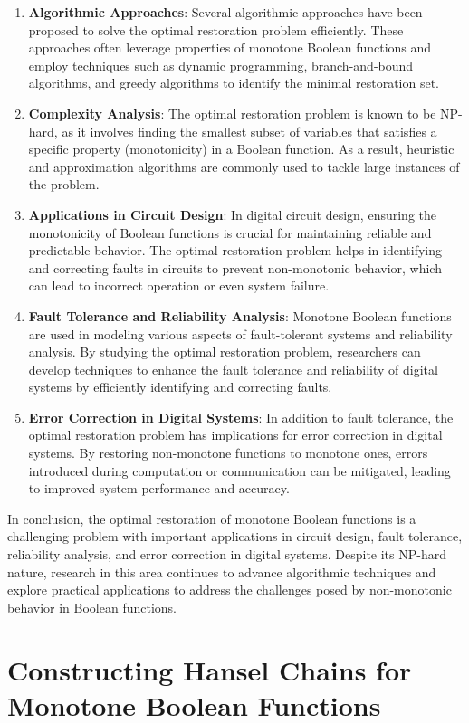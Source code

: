 \documentclass{article}
\renewcommand{\_}{\ifincsname_\else\legacyunderscore\fi}
\begin{document}
\begin{enumerate}
    \item \textbf{Algorithmic Approaches}: Several algorithmic approaches have been proposed to solve the optimal restoration problem efficiently. These approaches often leverage properties of monotone Boolean functions and employ techniques such as dynamic programming, branch-and-bound algorithms, and greedy algorithms to identify the minimal restoration set.
    
    \item \textbf{Complexity Analysis}: The optimal restoration problem is known to be NP-hard, as it involves finding the smallest subset of variables that satisfies a specific property (monotonicity) in a Boolean function. As a result, heuristic and approximation algorithms are commonly used to tackle large instances of the problem.
    
    \item \textbf{Applications in Circuit Design}: In digital circuit design, ensuring the monotonicity of Boolean functions is crucial for maintaining reliable and predictable behavior. The optimal restoration problem helps in identifying and correcting faults in circuits to prevent non-monotonic behavior, which can lead to incorrect operation or even system failure.
    
    \item \textbf{Fault Tolerance and Reliability Analysis}: Monotone Boolean functions are used in modeling various aspects of fault-tolerant systems and reliability analysis. By studying the optimal restoration problem, researchers can develop techniques to enhance the fault tolerance and reliability of digital systems by efficiently identifying and correcting faults.
    
    \item \textbf{Error Correction in Digital Systems}: In addition to fault tolerance, the optimal restoration problem has implications for error correction in digital systems. By restoring non-monotone functions to monotone ones, errors introduced during computation or communication can be mitigated, leading to improved system performance and accuracy.
\end{enumerate}

In conclusion, the optimal restoration of monotone Boolean functions is a challenging problem with important applications in circuit design, fault tolerance, reliability analysis, and error correction in digital systems. Despite its NP-hard nature, research in this area continues to advance algorithmic techniques and explore practical applications to address the challenges posed by non-monotonic behavior in Boolean functions.



\section*{Constructing Hansel Chains for Monotone Boolean Functions}
\end{document}
